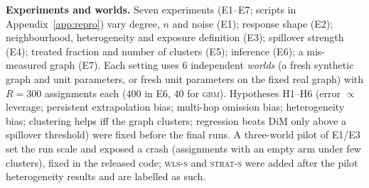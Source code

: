 \textbf{Experiments and worlds.} Seven experiments (E1--E7; scripts in Appendix~\ref{app:repro}) vary degree, $n$ and noise (E1); response shape (E2); neighbourhood, heterogeneity and exposure definition (E3); spillover strength (E4); treated fraction and number of clusters (E5); inference (E6); a mis-measured graph (E7). Each setting uses $6$ independent \emph{worlds} (a fresh synthetic graph and unit parameters, or fresh unit parameters on the fixed real graph) with $R=300$ assignments each ($400$ in E6, $40$ for \textsc{gbm}). Hypotheses H1--H6 (error $\propto$ leverage; persistent extrapolation bias; multi-hop omission bias; heterogeneity bias; clustering helps iff the graph clusters; regression beats DiM only above a spillover threshold) were fixed before the final runs. A three-world pilot of E1/E3 set the run scale and exposed a crash (assignments with an empty arm under few clusters), fixed in the released code; \textsc{wls-s} and \textsc{strat-s} were added after the pilot heterogeneity results and are labelled as such.
